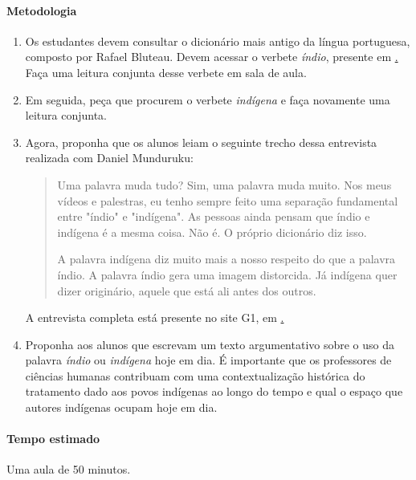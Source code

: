 \documentclass[12pt]{extarticle}
\begin{document}
\paragraph{Metodologia}

\begin{enumerate}

\item Os estudantes devem consultar o dicionário mais antigo da língua portuguesa, composto por Rafael Bluteau. Devem acessar o verbete
\emph{índio}, presente em \href{http://dicionarios.bbm.usp.br/pt-br/dicionario/1/indio}. Faça uma leitura conjunta desse verbete em sala de aula.

\item Em seguida, peça que procurem o verbete \emph{indígena} e faça novamente uma leitura conjunta.

\item Agora, proponha que os alunos leiam o seguinte trecho dessa entrevista realizada com Daniel Munduruku:

\begin{quote} Uma palavra muda tudo? Sim, uma palavra muda muito. Nos meus vídeos e palestras, eu tenho sempre feito uma separação fundamental entre "índio" e "indígena". As pessoas ainda pensam que índio e indígena é a mesma coisa. Não é. O próprio dicionário diz isso.

A palavra indígena diz muito mais a nosso respeito do que a palavra índio. A palavra índio gera uma imagem distorcida. Já indígena quer dizer originário, aquele que está ali antes dos outros.\end{quote}

A entrevista completa está presente no site G1, em \href{https://g1.globo.com/educacao/noticia/2019/04/19/dia-do-indio-e-data-folclorica-e-preconceituosa-diz-escritor-indigena-daniel-munduruku.ghtml}.

\item Proponha aos alunos que escrevam um texto argumentativo sobre o uso da palavra \emph{índio} ou \emph{indígena} hoje em dia. É importante que os professores de ciências humanas contribuam com uma contextualização histórica do tratamento dado aos povos indígenas ao longo do tempo e qual o espaço que autores indígenas ocupam hoje em dia.

\end{enumerate}

\paragraph{Tempo estimado} Uma aula de 50 minutos.
\end{document}
